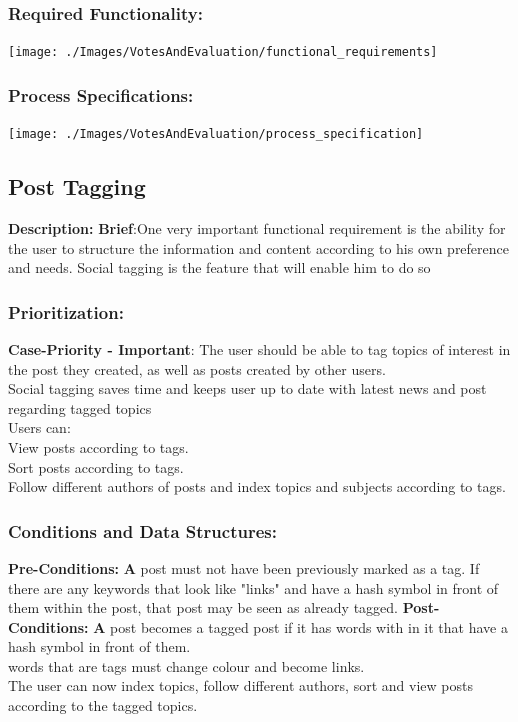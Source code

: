 \documentclass[a4paper,11pt]{article}
\begin{document}
\subsubsection{Required Functionality:} 
\begin{center}
\texttt{[image: ./Images/VotesAndEvaluation/functional\_requirements]}
\end{center}
\subsubsection{Process Specifications:} 
\begin{center}
\texttt{[image: ./Images/VotesAndEvaluation/process\_specification]}
\end{center}

\subsection{Post Tagging}
\textbf{Description:}
\textbf{Brief}:One very important functional requirement is the ability for the user to structure the information and content according to his own preference and needs. Social tagging is the feature that will enable him to do so
\subsubsection{Prioritization:} 
\textbf{Case-Priority - Important}: The user should be able to tag topics of interest in the post they created, as well
as posts created by other users.
\\Social tagging saves time and keeps user up to date with latest news and post regarding tagged topics
\\Users can: 
\\View posts according to tags.
\\Sort posts according to tags.
\\Follow different authors of posts and index topics and subjects according to tags.
\subsubsection{Conditions and Data Structures:}
\textbf{Pre-Conditions:}
\textbf A post must not have been previously marked as a tag. If there are any keywords that look like "links" and have a hash symbol in front of them within the post, that post may be seen as already tagged.
\textbf{Post-Conditions:}
\textbf A post becomes a tagged post if it has words with in it that have a hash symbol in front of them.
\\ words that are tags must change colour and become links.
\\The user can now index topics, follow different authors, sort and view posts according to the tagged topics.
\end{document}
